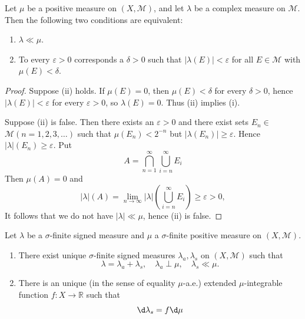 \documentclass[12pt, a4paper, oneside]{book}
\begin{document}
\begin{theorem}
    Let $\mu$ be a positive measure on $\left(X,\mathcal{M}\right)$, and let $\lambda$ be a complex measure on $\mathcal{M}$.
    Then the following two conditions are equivalent:
    \begin{enumerate}[]
        \item $\lambda \ll \mu$.
        \item To every $\varepsilon>0$ corresponds a $\delta>0$ such that $ |\lambda(E)| <\varepsilon$ for all $E \in \mathcal{M}$ with $\mu(E)<\delta$.
    \end{enumerate}
    \begin{proof}
        Suppose (ii) holds. If $\mu(E)=0$, then $\mu(E)<\delta$ for every $\delta>0$, hence $|\lambda(E)|<\varepsilon$ for every $\varepsilon>0$, so $\lambda(E)=0$. Thus (ii) implies (i).

        Suppose (ii) is false. Then there exists an $\varepsilon>0$ and there exist sets $E_n \in$ $\mathcal{M}(n=1,2,3, \ldots)$ such that $\mu\left(E_n\right)<2^{-n}$ but $\left|\lambda\left(E_n\right)\right| \geq \varepsilon$. Hence $|\lambda|\left(E_n\right) \geq \varepsilon$. Put
        $$
            A=\bigcap_{n=1}^{\infty} \bigcup_{i=n}^{\infty} E_i
        $$
        Then $\mu(A)=0$ and
        $$
            |\lambda|(A) = \lim _{n \rightarrow \infty} |\lambda|\left(\bigcup_{i=n}^{\infty} E_i\right) \geq \varepsilon
            >0,
        $$
        It follows that we do not have $|\lambda| \ll \mu$, hence (ii) is false.
    \end{proof}
\end{theorem}

\begin{theorem}
    Let $\lambda$ be a $\sigma$-finite signed measure and $\mu$ a $\sigma$-finite positive measure on $(X, \mathcal{M})$.
    \begin{enumerate}
        \item
              There exist unique $\sigma$-finite signed measures $\lambda_a, \lambda_s$ on $(X, \mathcal{M})$ such that
              \begin{equation*}
                  \lambda = \lambda_a + \lambda_s, \quad \lambda_a \perp \mu, \quad \lambda_s \ll \mu.
              \end{equation*}
        \item
              There is an unique (in the sense of equality $\mu$-a.e.) extended $\mu$-integrable function $f: X \rightarrow \mathbb{R}$ such that
              \begin{equation*}
                  \d \lambda_s=f \d \mu
              \end{equation*}
    \end{enumerate}
\end{theorem}
\end{document}
